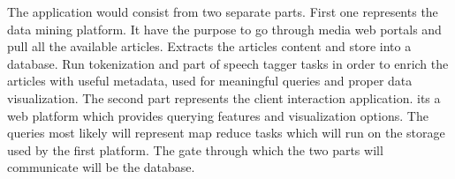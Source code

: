 The application would consist from two separate parts. First one represents the data mining platform. It have the purpose to go through media web portals and pull all the available articles. Extracts the articles content and store into a database. Run tokenization and part of speech tagger tasks in order to enrich the articles with useful metadata, used for meaningful queries and proper data visualization. The second part represents the client interaction application. its a web platform which provides querying features and visualization options. The queries most likely will represent map reduce tasks which will run on the storage used by the first platform. The gate through which the two parts will communicate will be the database.

\clearpage